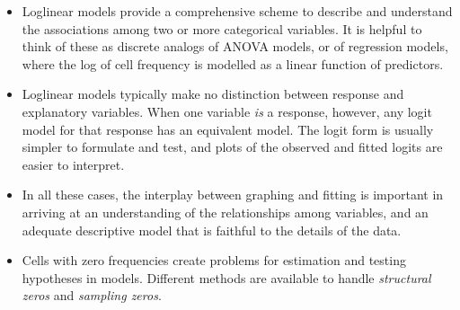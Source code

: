 \begin{itemize}
\item Loglinear models provide a comprehensive scheme to describe and
understand the associations among two or more categorical variables.
It is helpful to think of these as discrete analogs of ANOVA models,
or of regression models, where the log of cell frequency is modelled
as a linear function of predictors.


\item Loglinear models typically make no distinction between response
and explanatory variables.
When one variable \emph{is} a response, however, any logit model for
that response has an equivalent \loglin model.
The logit form is usually simpler to formulate and test, and plots of
the observed and fitted logits are easier to interpret.


\item In all these cases, the interplay between graphing and fitting is important in 
arriving at an understanding of the relationships among variables, and
an adequate descriptive model that is faithful to the details of the
data.

\item Cells with zero frequencies create problems for estimation and testing
hypotheses in \loglin models.  Different methods are available to 
handle \emph{structural zeros} and \emph{sampling zeros}.



\end{itemize}

